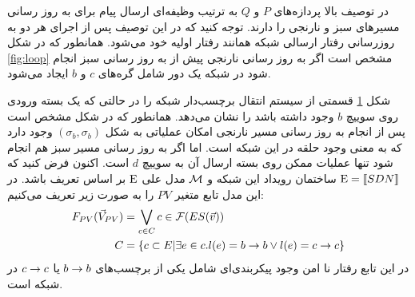 در توصیف بالا پردازه‌های
$P$
و
$Q$
به ترتیب وظیفه‌ای ارسال پیام برای به روز رسانی مسیر‌های سبز و نارنجی را دارند.
توجه کنید که در این توصیف پس از اجرای هر دو به روزرسانی رفتار ارسالی شبکه همانند رفتار اولیه خود می‌شود.
همانطور که در شکل
\ref{fig:loop}
مشخص است اگر به روز رسانی نارنجی پیش از به روز رسانی سبز انجام شود در شبکه یک دور شامل گره‌های
$c$
و
$b$
ایجاد می‌شود.
\begin{figure}
    \centering
    \caption{}
    \label{fig:loop:lts}
\end{figure}
شکل
\ref{fig:loop:lts}
قسمتی از سیستم انتقال برچسب‌دار شبکه را در حالتی که یک بسته ورودی روی سوییچ
$b$
وجود داشته باشد را نشان می‌دهد.
همانطور که در شکل مشخص است پس از انجام به روز رسانی مسیر نارنجی امکان عملیاتی به شکل
$(\sigma_b,\sigma_b)$
وجود دارد که به معنی وجود حلقه در این شبکه است.
اما اگر به روز رسانی مسیر سبز هم انجام شود تنها عملیات ممکن روی بسته ارسال آن به سوییچ
$d$
است.
اکنون فرض کنید که
$\mathrm{E} = \llbracket SDN \rrbracket$
ساختمان رویداد این شبکه و
$\mathcal{M}$
مدل علی
$\mathrm{E}$
بر اساس تعریف
باشد.
در این مدل تابع متغیر
$PV$
را به صورت زیر تعریف می‌کنیم:
\begin{align*}
    F_{PV}(\vec V_{PV}) & = \bigvee_{c \in C} c \in \mathcal{F}(ES(\vec v)) \\
    C      & = \{c \subset E | \exists e \in c.
        l(e) = b\rightarrow b \vee l(e) = c\rightarrow c \}
\end{align*}
در این تابع رفتار نا امن وجود پیکربندی‌ای شامل یکی از برچسب‌های
$b \rightarrow b$
یا
$c \rightarrow c$
در شبکه است.
